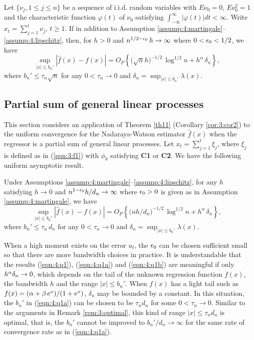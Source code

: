 \begin{cor} 
Let  $\{\nu_{j}, 1 \le j\le n \}$ be a sequence of i.i.d.
random variables with $E\nu_{0}=0$, $E\nu _{0}^{2}=1$ and the
characteristic function $\varphi (t)$ of $\nu_{0}$ satisfying
$\int_{-\infty }^{\infty }|\varphi (t)|dt<\infty $. Write $x_t=\sum_{j=1}^t\nu_j$, $t\ge 1$. If in addition to Assumption \ref{assump:4:martingale}--\ref{assump:4:lipschitz}, then,  for  $h> 0$  and $n^{1/2-\epsilon_0}\, h\to \infty$ where $0<\epsilon_0<1/2$, we have
\begin{equation}
\sup_{|x|\le b_n'}|\widehat{f}(x)-f(x)|=
O_{P}\left\{\big(\sqrt{n}h\big)^{-1/2}\,\log^{1/2}n
+h^{\alpha}\, \delta_n\right\},
\label{eqn:4:q1a}\end{equation}
where $b_n'\le \tau_n\sqrt n$ for any $0<\tau_n\to 0$ and $\delta_n=\sup_{|x|\le b_n'}\lambda(x)$.
\end{cor}

\subsection{Partial sum of general linear processes}

This section considers an application of Theorem \ref{th11} (Corollary \ref{cor:3:cor2}) to the uniform convergence for the Nadaraya-Watson estimator $\widehat{f}(x)$ when the regressor is a partial sum of general linear processes. Let $x_t=\sum_{j=1}^t\xi_j$, where $\xi_j$ is defined as in (\ref {eqn:3:f1}) with $\phi_k$ satisfying {\bf C1} or {\bf C2}. We have the following uniform asymptotic result.

\begin{thm}  Under Assumptions \ref{assump:4:martingale}--\ref{assump:4:lipschitz},
for any $h$ satisfying $h\to 0$ and $n^{1-\epsilon_0}h/d_n\to \infty$ where $\epsilon_0>0$ is given as in Assumption \ref{assump:4:martingale}, we have
\begin{equation} 
\sup_{|x|\le b_n'}|\widehat{f}(x)-f(x)|=
O_{P}\left\{\big(nh/d_n\big)^{-1/2}\,\log^{1/2}n
+h^{\alpha}\, \delta_n\right\},
\label{eqn:4:q1b}\end{equation}
where $b_n'\le \tau_n\,d_n $ for any  $0<\tau_n \to 0$ and $\delta_n=\sup_{|x|\le b_n'}\lambda(x)$.
\end{thm}


\begin{rem} When a high moment exists on the error $u_t$,
the $\epsilon_0$ can be chosen sufficient small so that there are more bandwidth choices  in practice. It is understandable that the results (\ref {eqn:4:q1}), (\ref {eqn:4:q1a}) and (\ref {eqn:4:q1b}) are meaningful if only $h^{\alpha}\delta_n\to 0$, which depends on the tail of the unknown regression function $f(x)$, the bandwidth $h$ and the range $|x|\le b_n'$.
When $f(x)$ has a light tail such as $f(x)=(\alpha+\beta\, e^{x})/(1+e^x)$, $\delta_n$ may be bounded by a constant. In this situation, the $b_n'$ in (\ref {eqn:4:q1a}) can be chosen to be $\tau_n d_n$ for some $0<\tau_n\to 0$. Similar to the arguments in Remark \ref{rem:3:optimal}, this kind of range $|x|\le \tau_n d_n$ is optimal, that is, the $b_n'$ cannot be improved  to $b_n' / d_n \to \infty$ for the same rate of convergence rate as in (\ref {eqn:4:q1a}).
\end{rem}

